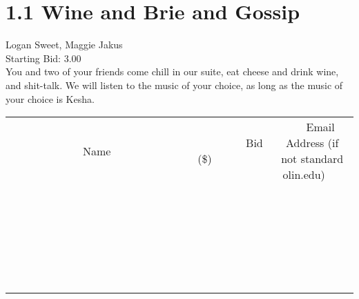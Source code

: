 \documentclass[11pt]{article}
\begin{document}
		
					\section*{1.1 Wine and Brie and Gossip}
					Logan Sweet, Maggie Jakus \\
					Starting Bid: 3.00 \\
					You and two of your friends come chill in our suite, eat cheese and drink wine, and shit-talk. We will listen to the music of your choice, as long as the music of your choice is Kesha. \\
					[6ex]
					\begin{tabular}{c c c}
						~~~~~~~~~~~~~Name~~~~~~~~~~~~~ & ~~~~~~~~~Bid (\$)~~~~~~~~~ & ~~~Email Address (if not standard olin.edu)~~~ \\
				
 & & \\
\hline
 & & \\
\hline
 & & \\
\hline
 & & \\
\hline
 & & \\
\hline
 & & \\
\hline
 & & \\
\hline
 & & \\
\hline
 & & \\
\hline
 & & \\
\hline
 & & \\
\hline
 & & \\
\hline
 & & \\
\hline
 & & \\
\hline
 & & \\
\hline
 & & \\
\hline
 & & \\
\hline
 & & \\
\hline
 & & \\
\hline
 & & \\
\hline
 & & \\
\hline
 & & \\
\hline
 & & \\
\hline
 & & \\
\hline
 & & \\
\hline
 & & \\
\hline
					\end{tabular}
					\clearpage
				
\end{document}
